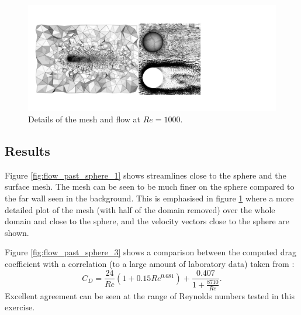 \begin{figure}
\centering
\includegraphics[width=15cm,clip]{examples_images/flow_past_sphere/sphere-Re1000-combined.pdf}
\caption{Details of the mesh and flow at $Re=1000$.}
\label{fig:flow_past_sphere_2}
\end{figure}

\subsection{Results}
Figure \ref{fig:flow_past_sphere_1} shows streamlines close to the sphere and the surface mesh.
The mesh can be seen to be much finer on the sphere compared to the far wall seen in the background.
This is emphasised in figure \ref{fig:flow_past_sphere_2} where a more detailed plot of the mesh (with
half of the domain removed) over the whole domain and close to the sphere, and the velocity vectors
close to the sphere are shown.

Figure \ref{fig:flow_past_sphere_3} shows a comparison between the computed drag coefficient with
a correlation (to a large amount of laboratory data) taken from \citet{brown2003}:
\begin{equation}
C_D = \frac{24}{Re}\left(1+0.15Re^{0.681}\right) + \frac{0.407}{1+\frac{8710}{Re}}.
\label{eqn:sphere_drag_corr}
\end{equation}
Excellent agreement can be seen at the range of Reynolds numbers tested in this exercise.


